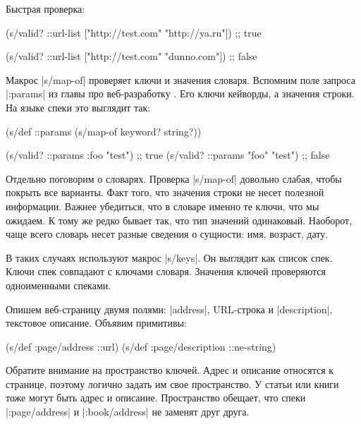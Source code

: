 \noindent
Быстрая проверка:

\begin{english}
  \begin{clojure}
(s/valid? ::url-list ["http://test.com" "http://ya.ru"])
;; true

(s/valid? ::url-list ["http://test.com" "dunno.com"])
;; false
  \end{clojure}
\end{english}

Макрос \spverb|s/map-of| проверяет ключи и значения словаря. Вспомним поле
запроса \spverb|:params|  из главы про
веб-разработку . Его ключи кейворды, а значения строки. На
языке спеки это выглядит так:

\begin{english}
  \begin{clojure}
(s/def ::params
  (s/map-of keyword? string?))

(s/valid? ::params {:foo "test"})  ;; true
(s/valid? ::params {"foo" "test"}) ;; false
  \end{clojure}
\end{english}

Отдельно поговорим о словарях. Проверка \spverb|s/map-of| довольно слабая, чтобы
покрыть все варианты. Факт того, что значения строки не несет полезной
информации. Важнее убедиться, что в словаре именно те ключи, что мы ожидаем. К
тому же редко бывает так, что тип значений одинаковый. Наоборот, чаще всего
словарь несет разные сведения о сущности: имя, возраст, дату.

В таких случаях используют макрос \spverb|s/keys|. Он выглядит как список
спек. Ключи спек совпадают с ключами словаря. Значения ключей проверяются
одноименными спеками.

Опишем веб-страницу двумя полями: \spverb|address|, URL-строка и
\spverb|description|, текстовое описание. Объявим примитивы:

\begin{english}
  \begin{clojure}
(s/def :page/address ::url)
(s/def :page/description ::ne-string)
  \end{clojure}
\end{english}

Обратите внимание на пространство ключей. Адрес и описание относятся к странице,
поэтому логично задать им свое пространство. У статьи или книги тоже могут быть
адрес и описание. Пространство обещает, что спеки \spverb|:page/address| и
\spverb|:book/address| не заменят друг друга.

